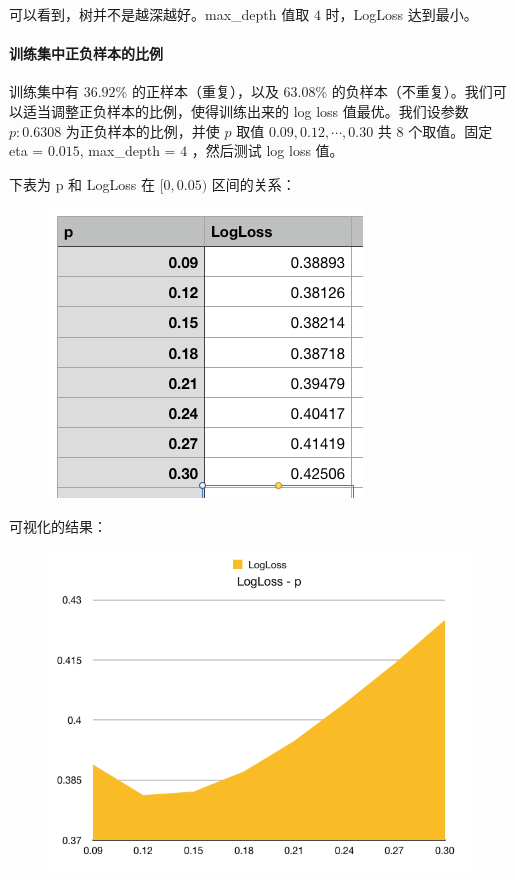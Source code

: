 \documentclass{article}
\begin{document}
可以看到，树并不是越深越好。max\_depth 值取 $4$ 时，LogLoss 达到最小。

\paragraph{训练集中正负样本的比例}

训练集中有 $36.92\%$ 的正样本（重复），以及 $63.08\%$ 的负样本（不重复）。我们可以适当调整正负样本的比例，使得训练出来的 log loss 值最优。我们设参数 $p : 0.6308$ 为正负样本的比例，并使 $p$ 取值 $0.09, 0.12, \cdots, 0.30$ 共 $8$ 个取值。固定 eta = $0.015$, max\_depth = $4$ ，然后测试 log loss 值。

下表为 p 和 LogLoss 在 $[0, 0.05)$ 区间的关系：

\begin{figure}[!h]
\centering
\includegraphics[scale=0.5]{tu6.png}
\end{figure}

\newpage

可视化的结果：

\begin{figure}[!h]
\centering
\includegraphics[scale=0.5]{tu5.png}
\end{figure}
\end{document}
